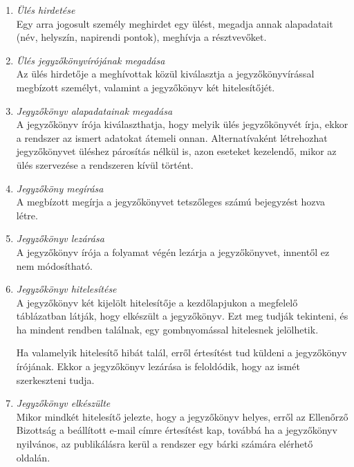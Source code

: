\documentclass[a4paper,12pt,oneside]{report}
\begin{document}
\begin{enumerate}
  \item \emph{Ülés hirdetése}\\
    Egy arra jogosult személy meghirdet egy ülést, megadja annak alapadatait (név, helyszín, napirendi pontok), meghívja a résztvevőket.
    
  \item \emph{Ülés jegyzőkönyvírójának megadása}\\
    Az ülés hirdetője a meghívottak közül kiválasztja a jegyzőkönyvírással megbízott személyt, valamint a jegyzőkönyv két hitelesítőjét.
    
  \item \emph{Jegyzőkönyv alapadatainak megadása}\\
    A jegyzőkönyv írója kiválaszthatja, hogy melyik ülés jegyzőkönyvét írja, ekkor a rendszer az ismert adatokat átemeli onnan. Alternatívaként létrehozhat jegyzőkönyvet üléshez párosítás nélkül is, azon eseteket kezelendő, mikor az ülés szervezése a rendszeren kívül történt.

  \item \emph{Jegyzőköny megírása}\\
    A megbízott megírja a jegyzőkönyvet tetszőleges számú bejegyzést hozva létre.
    
  \item \emph{Jegyzőkönyv lezárása}\\
    A jegyzőkönyv írója a folyamat végén lezárja a jegyzőkönyvet, innentől ez nem módosítható.

  \item \emph{Jegyzőkönyv hitelesítése}\\
    A jegyzőkönyv két kijelölt hitelesítője a kezdőlapjukon a megfelelő táblázatban látják, hogy elkészült a jegyzőkönyv. Ezt meg tudják tekinteni, és ha mindent rendben találnak, egy gombnyomással hitelesnek jelölhetik.

    Ha valamelyik hitelesítő hibát talál, erről értesítést tud küldeni a jegyzőkönyv írójának. Ekkor a jegyzőkönyv lezárása is feloldódik, hogy az ismét szerkeszteni tudja.

  \item \emph{Jegyzőkönyv elkészülte}\\
    Mikor mindkét hitelesítő jelezte, hogy a jegyzőkönyv helyes, erről az Ellenőrző Bizottság a beállított e-mail címre értesítést kap, továbbá ha a jegyzőkönyv nyilvános, az publikálásra kerül a rendszer egy bárki számára elérhető oldalán.

\end{enumerate}
\end{document}
